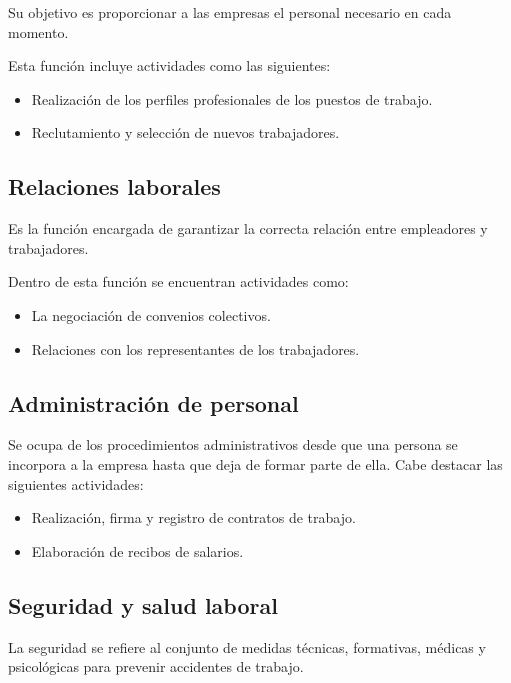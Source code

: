 \documentclass{article}
\begin{document}
	Su objetivo es proporcionar a las empresas el personal necesario en cada momento.
	
	Esta función incluye actividades como las siguientes:
	
	\begin{itemize}
		\item Realización de los perfiles profesionales de los puestos de trabajo.
		\item Reclutamiento y selección de nuevos trabajadores.
	\end{itemize}
	
	\subsection*{Relaciones laborales}
	
	Es la función encargada de garantizar la correcta relación entre empleadores y trabajadores.
	
	Dentro de esta función se encuentran actividades como:
	
	\begin{itemize}
		\item La negociación de convenios colectivos.
		\item Relaciones con los representantes de los trabajadores.
	\end{itemize}
	
	\subsection*{Administración de personal}
	
	Se ocupa de los procedimientos administrativos desde que una persona se incorpora a la empresa hasta que deja de formar parte de ella. Cabe destacar las siguientes actividades:
	
	\begin{itemize}
		\item Realización, firma y registro de contratos de trabajo.
		\item Elaboración de recibos de salarios.
	\end{itemize}
	
	\subsection*{Seguridad y salud laboral}
	
	La seguridad se refiere al conjunto de medidas técnicas, formativas, médicas y psicológicas para prevenir accidentes de trabajo.
	
\end{document}
